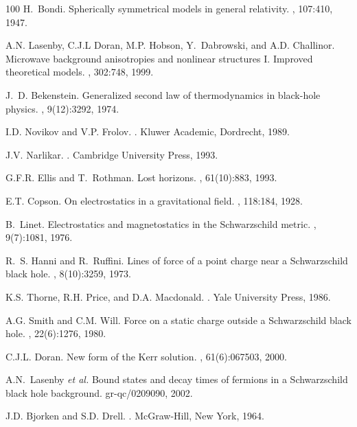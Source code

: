 \documentclass[a4paper]{article}
\numberwithin{equation}{section}
\begin{document}
\begin{thebibliography}{100}
H.~Bondi.
\newblock Spherically symmetrical models in general relativity.
, 107:410, 1947.

A.N. Lasenby, C.J.L Doran, M.P. Hobson, Y.~Dabrowski, and A.D. Challinor.
\newblock Microwave background anisotropies and nonlinear structures {I}.
  {I}mproved theoretical models.
, 302:748, 1999.

J.~D. Bekenstein.
\newblock Generalized second law of thermodynamics in black-hole physics.
, 9(12):3292, 1974.

I.D. Novikov and V.P. Frolov.
.
\newblock Kluwer Academic, Dordrecht, 1989.

J.V. Narlikar.
.
\newblock Cambridge University Press, 1993.

G.F.R. Ellis and T.~Rothman.
\newblock Lost horizons.
, 61(10):883, 1993.

E.T. Copson.
\newblock On electrostatics in a gravitational field.
, 118:184, 1928.

B.~Linet.
\newblock Electrostatics and magnetostatics in the {S}chwarzschild metric.
, 9(7):1081, 1976.

R.~S. Hanni and R.~Ruffini.
\newblock Lines of force of a point charge near a {S}chwarzschild black hole.
, 8(10):3259, 1973.

K.S. Thorne, R.H. Price, and D.A. Macdonald.
.
\newblock Yale University Press, 1986.

A.G. Smith and C.M. Will.
\newblock Force on a static charge outside a {S}chwarzschild black hole.
, 22(6):1276, 1980.

C.J.L. Doran.
\newblock New form of the {K}err solution.
, 61(6):067503, 2000.

A.N.~Lasenby \textit{et al.}
\newblock Bound states and decay times of fermions in a {S}chwarzschild black
  hole background.
\newblock gr-qc/0209090, 2002.

J.D. Bjorken and S.D. Drell.
.
\newblock McGraw-Hill, New York, 1964.


\end{thebibliography}
\end{document}
